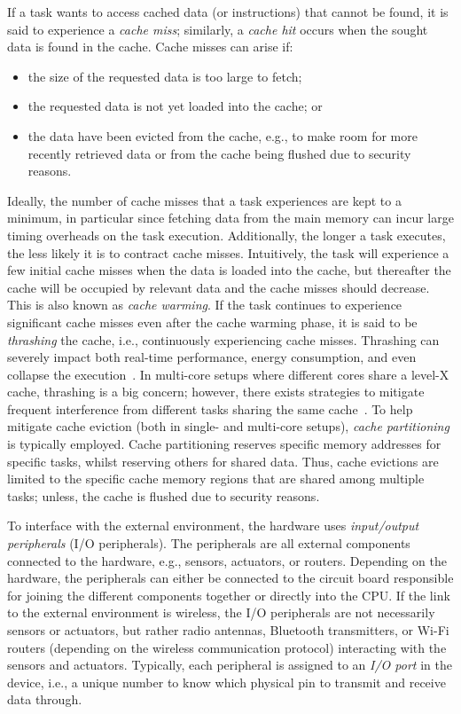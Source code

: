 If a task wants to access cached data (or instructions) that cannot be found, it is said to experience a \emph{cache miss}; similarly, a \emph{cache hit} occurs when the sought data is found in the cache.
Cache misses can arise if:
%
\begin{itemize}
    \item the size of the requested data is too large to fetch;
    \item the requested data is not yet loaded into the cache; or
    \item the data have been evicted from the cache, e.g., to make room for more recently retrieved data or from the cache being flushed due to security reasons.
\end{itemize}
%
Ideally, the number of cache misses that a task experiences are kept to a minimum, in particular since fetching data from the main memory can incur large timing overheads on the task execution.
Additionally, the longer a task executes, the less likely it is to contract cache misses.
Intuitively, the task will experience a few initial cache misses when the data is loaded into the cache, but thereafter the cache will be occupied by relevant data and the cache misses should decrease.
This is also known as \emph{cache warming}.
If the task continues to experience significant cache misses even after the cache warming phase, it is said to be \emph{thrashing} the cache, i.e., continuously experiencing cache misses.
Thrashing can severely impact both real-time performance, energy consumption, and even collapse the execution~\cite{Wadleigh:2000}.
In multi-core setups where different cores share a level-X cache, thrashing is a big concern; however, there exists strategies to mitigate frequent interference from different tasks sharing the same cache~\cite{Brandenburg:2011}.
To help mitigate cache eviction (both in single- and multi-core setups), \emph{cache partitioning} is typically employed.
Cache partitioning reserves specific memory addresses for specific tasks, whilst reserving others for shared data.
Thus, cache evictions are limited to the specific cache memory regions that are shared among multiple tasks; unless, the cache is flushed due to security reasons.

To interface with the external environment, the hardware uses \emph{input/output peripherals} (I/O peripherals).
The peripherals are all external components connected to the hardware, e.g., sensors, actuators, or routers.
Depending on the hardware, the peripherals can either be connected to the circuit board responsible for joining the different components together or directly into the CPU.
If the link to the external environment is wireless, the I/O peripherals are not necessarily sensors or actuators, but rather radio antennas, Bluetooth transmitters, or Wi-Fi routers (depending on the wireless communication protocol) interacting with the sensors and actuators.
Typically, each peripheral is assigned to an \emph{I/O port} in the device, i.e., a unique number to know which physical pin to transmit and receive data through. 

